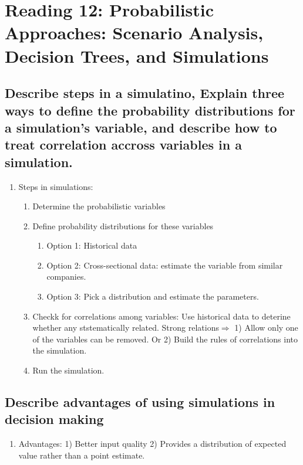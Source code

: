 \documentclass{article}
\newcommand{\be}{\begin{enumerate}}
\newcommand{\ee}{\end{enumerate}}
\begin{document}
\section{Reading 12: Probabilistic Approaches: Scenario Analysis, Decision Trees, and Simulations}
\subsection{Describe steps in a simulatino, Explain three ways to define the probability 
        distributions for a simulation's variable, and describe how to treat correlation accross
    variables in a simulation.}
        \be
            \item Steps in simulations:
                \be
                    \item Determine the probabilistic variables
                    \item Define probability distributions for these variables
                        \be
                            \item Option 1: Historical data
                            \item Option 2: Cross-sectional data: estimate the variable from similar 
                                companies.
                            \item Option 3: Pick a distribution and estimate the parameters.
                        \ee
                    \item Checkk for correlations among variables: Use historical data to deterine
                        whether any ststematically related. Strong relations$\Rightarrow$ 1) Allow only
                        one of the variables can be removed. Or 2) Build the rules of correlations
                        into the simulation.
                    \item Run the simulation.
                \ee

        \ee
\subsection{Describe advantages of using simulations in decision making}
\be
    \item Advantages: 1) Better input quality   2) Provides a distribution of expected value
        rather than a point estimate.
\ee
\end{document}
